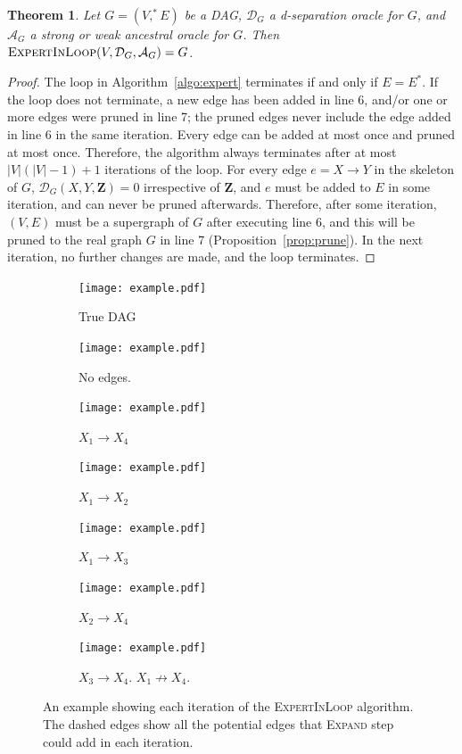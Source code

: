 \documentclass{uai2025} %
\newtheorem{theorem}{Theorem}
\begin{document}
\begin{theorem}
Let $G=(V,^*E)$ be a DAG, $\mathcal{D}_G$ a d-separation oracle for $G$, and 
$\mathcal{A}_G$ a strong or weak ancestral oracle for $G$. Then 
$\textsc{ExpertInLoop}(V,\mathcal{D}_G,\mathcal{A}_G)=G$.
\end{theorem}

\begin{proof}
The loop in Algorithm~\ref{algo:expert} terminates if and only if $E=E^*$. If the loop does not 
terminate, a new edge has been added in line 6, and/or one or more edges were pruned in line 7; the pruned 
edges never include the edge added in line 6 in the same iteration.
Every edge can be added at 
most once and pruned at most once. Therefore, the algorithm always terminates
after at most $|V|(|V|-1)+1$ iterations of the loop. For every edge $e=X\to Y $ in the skeleton of $G$, $\mathcal{D}_G(X,Y,\mathbf{Z})=0$ irrespective of $\mathbf{Z}$, and $e$ must be added to $E$ in some iteration, and can never be pruned afterwards. Therefore, after some iteration, $(V,E)$ must be a supergraph of $G$ after executing line 6, and this will be pruned to the real graph $G$ in line 7 (Proposition~\ref{prop:prune}). In the next iteration, no further changes are made, and the loop terminates.
\end{proof} 


\begin{figure}[t!]
	\begin{subfigure}{0.125 \textwidth}
		\centering
		\texttt{[image: example.pdf]}
		\caption{True DAG}
	\end{subfigure}%
	\begin{subfigure}{0.125 \textwidth}
		\centering
		\texttt{[image: example.pdf]}
		\caption{No edges.}
	\end{subfigure}%
	\begin{subfigure}{0.125 \textwidth}
		\centering
		\texttt{[image: example.pdf]}
		\caption{$ X_1 \rightarrow X_4 $}
	\end{subfigure}%
	\begin{subfigure}{0.125 \textwidth}
		\centering
		\texttt{[image: example.pdf]}
		\caption{$ X_1 \rightarrow X_2 $}
	\end{subfigure}
	\begin{subfigure}{0.125 \textwidth}
		\centering
		\texttt{[image: example.pdf]}
		\caption{$ X_1 \rightarrow X_3 $}
	\end{subfigure}%
	\begin{subfigure}{0.125 \textwidth}
		\centering
		\texttt{[image: example.pdf]}
		\caption{$ X_2 \rightarrow X_4 $}
	\end{subfigure}%
	\begin{subfigure}{0.250 \textwidth}
		\centering
		\texttt{[image: example.pdf]}
		\caption{$ X_3 \rightarrow X_4 $. $ X_1 \not \rightarrow X_4 $.}
	\end{subfigure}
	\caption{An example showing each iteration of the \textsc{ExpertInLoop} algorithm. The dashed edges show all the potential edges that \textsc{Expand} step could add in each iteration.}
\end{figure}
\end{document}
